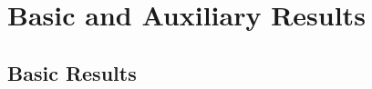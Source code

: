 \appendix
\setcounter{chapter}{0}
\renewcommand{\chaptername}{Apéndice}
\renewcommand{\theequation}{\Alph{chapter}.\arabic{section}.\arabic{equation}}
\setcounter{equation}{0}


\chapter{Basic and Auxiliary Results}

\section{Basic Results}

